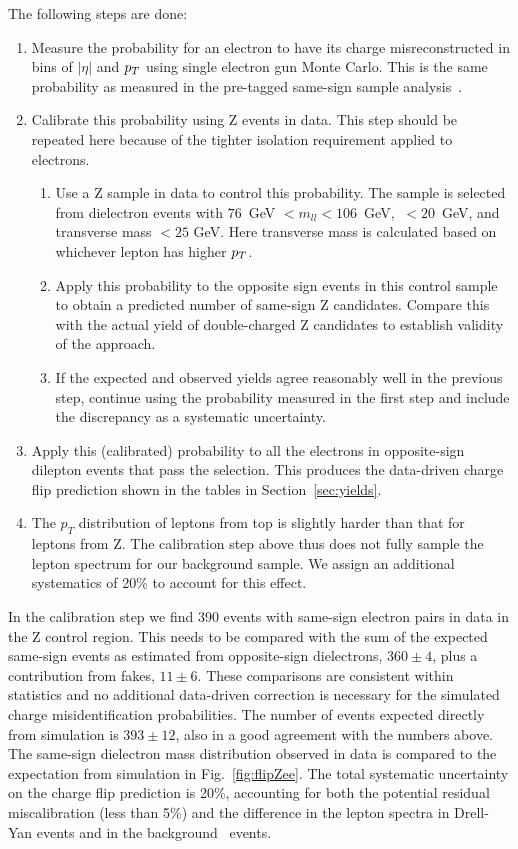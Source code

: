 The following steps are done:
\begin{enumerate}
	\item Measure the probability for an electron to have its charge misreconstructed 
		in bins of $|\eta |$ and $p_T$ using single electron gun Monte Carlo.
		This is the same probability as measured in the pre-tagged same-sign sample analysis~\cite{ssnote2011}.
	\item Calibrate this probability using Z events in data. 
		This step should be repeated here because of the tighter isolation requirement applied to electrons.
	\begin{enumerate}
		\item Use a Z sample in data to control this probability.
			The sample is selected from dielectron events with $76$\ GeV $ < m_{ll} < 106$\ GeV,  
			\met $~ < 20$\ GeV, and transverse mass $< 25$ GeV.
			Here transverse mass is calculated based on whichever lepton has higher $p_T$. 
		\item Apply this probability to the opposite sign events in this control sample
			to obtain a predicted number of same-sign Z candidates.
			Compare this with the actual yield of double-charged Z candidates
			to establish validity of the approach.
		\item If the expected and observed yields agree reasonably well in the previous step, continue using
			the probability measured in the first step and include the discrepancy as a systematic uncertainty.
	\end{enumerate}
	\item Apply this (calibrated) probability to all the electrons in opposite-sign dilepton events that pass the selection. 
		This produces the data-driven charge flip  prediction shown in the tables in Section~\ref{sec:yields}. 
	\item The $p_T$ distribution of leptons from top is slightly harder than that for leptons from Z. 
		The calibration step above thus does not fully sample the lepton spectrum for our background sample. 
		We assign an additional systematics of 20\% to account for this effect.
\end{enumerate}

In the calibration step we find 390 events with same-sign electron pairs in data in the Z control region.
This needs to be compared with the sum of the expected same-sign events as estimated from
opposite-sign dielectrons, $360\pm4$, plus a contribution from fakes, $11\pm 6$.
These comparisons are consistent within statistics and no additional data-driven correction
is necessary for the simulated charge misidentification probabilities.
The number of events expected directly from simulation is  $393\pm 12$, also in a good agreement with the numbers above.
The same-sign dielectron mass distribution observed in data is compared to the expectation from
simulation in Fig.~\ref{fig:flipZee}.
The total systematic uncertainty on the charge flip prediction is 20\%,
accounting for both the potential residual miscalibration (less than 5\%) and the difference in the lepton
spectra in Drell-Yan events and in the background \ttbar\ events.


